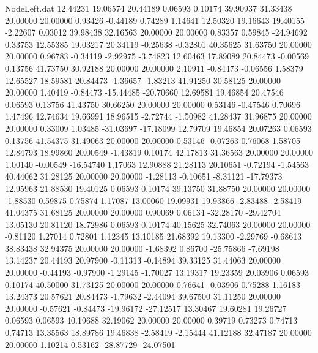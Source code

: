 \begin{filecontents}{NodeLeft.dat}
  12.44231   19.06574   20.44189     0.06593    0.10174   39.90937   31.33438   20.00000   20.00000    0.93426   -0.44189    0.74289    1.14641
  12.50320   19.16643   19.40155    -2.22607    0.03012   39.98438   32.16563   20.00000   20.00000    0.83357    0.59845  -24.94692    0.33753
  12.55385   19.03217   20.34119    -0.25638   -0.32801   40.35625   31.63750   20.00000   20.00000    0.96783   -0.34119   -2.92975   -3.74823
  12.60463   17.89089   20.84473    -0.00569    0.13756   41.73750   30.92188   20.00000   20.00000    2.10911   -0.84473   -0.06556    1.58379
  12.65527   18.59581   20.84473    -1.36657   -1.83213   41.91250   30.58125   20.00000   20.00000    1.40419   -0.84473  -15.44485  -20.70660
  12.69581   19.46854   20.47546     0.06593    0.13756   41.43750   30.66250   20.00000   20.00000    0.53146   -0.47546    0.70696    1.47496
  12.74634   19.66991   18.96515    -2.72744   -1.50982   41.28437   31.96875   20.00000   20.00000    0.33009    1.03485  -31.03697  -17.18099
  12.79709   19.46854   20.07263     0.06593    0.13756   41.54375   31.49063   20.00000   20.00000    0.53146   -0.07263    0.76068    1.58705
  12.84793   18.99860   20.00549    -1.43819    0.10174   42.17813   31.36563   20.00000   20.00000    1.00140   -0.00549  -16.54740    1.17063
  12.90888   21.28113   20.10651    -0.72194   -1.54563   40.44062   31.28125   20.00000   20.00000   -1.28113   -0.10651   -8.31121  -17.79373
  12.95963   21.88530   19.40125     0.06593    0.10174   39.13750   31.88750   20.00000   20.00000   -1.88530    0.59875    0.75874    1.17087
  13.00060   19.09931   19.93866    -2.83488   -2.58419   41.04375   31.68125   20.00000   20.00000    0.90069    0.06134  -32.28170  -29.42704
  13.05130   20.81120   18.72986     0.06593    0.10174   40.15625   32.74063   20.00000   20.00000   -0.81120    1.27014    0.72801    1.12345
  13.10185   21.68392   19.13300    -2.29769   -0.68613   38.83438   32.94375   20.00000   20.00000   -1.68392    0.86700  -25.75866   -7.69198
  13.14237   20.44193   20.97900    -0.11313   -0.14894   39.33125   31.44063   20.00000   20.00000   -0.44193   -0.97900   -1.29145   -1.70027
  13.19317   19.23359   20.03906     0.06593    0.10174   40.50000   31.73125   20.00000   20.00000    0.76641   -0.03906    0.75288    1.16183
  13.24373   20.57621   20.84473    -1.79632   -2.44094   39.67500   31.11250   20.00000   20.00000   -0.57621   -0.84473  -19.96172  -27.12517
  13.30467   19.60281   19.26727     0.06593    0.06593   40.19688   32.19062   20.00000   20.00000    0.39719    0.73273    0.74713    0.74713
  13.35563   18.89786   19.46838    -2.58419   -2.15444   41.12188   32.47187   20.00000   20.00000    1.10214    0.53162  -28.87729  -24.07501

\end{filecontents}
